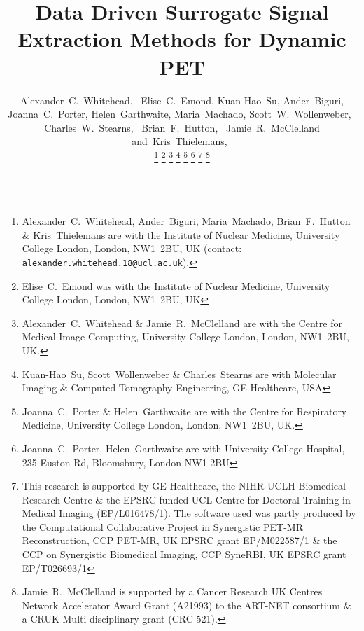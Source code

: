 \documentclass[10pt, twocolumn, twoside, letterpaper]{IEEEtran}
\begin{document}
\title{Data Driven Surrogate Signal Extraction Methods for Dynamic PET}

\pagestyle{plain}

\author{Alexander~C.~Whitehead,~
        Elise~C.~Emond,
        Kuan-Hao~Su,
        Ander~Biguri,
        Joanna~C.~Porter,
        Helen~Garthwaite,
        Maria~Machado,
        Scott~W.~Wollenweber,~
        Charles~W.~Stearns,~
        Brian~F.~Hutton,~
        Jamie~R.~McClelland
        and~Kris~Thielemans,~%
        
    \vspace{-1.0cm}

    \thanks{Alexander~C.~Whitehead, Ander~Biguri, Maria~Machado, Brian~F.~Hutton \& Kris~Thielemans are with the Institute of Nuclear Medicine, University College London, London, NW1~2BU, UK (contact: \texttt{alexander.whitehead.18@ucl.ac.uk}).}%
    \thanks{Elise~C.~Emond was with the Institute of Nuclear Medicine, University College London, London, NW1~2BU, UK}
    \thanks{Alexander~C.~Whitehead \& Jamie~R.~McClelland are with the Centre for Medical Image Computing, University College London, London, NW1~2BU, UK.}%
    \thanks{Kuan-Hao~Su, Scott~Wollenweber \& Charles~Stearns are with Molecular Imaging \& Computed Tomography Engineering, GE Healthcare, USA}%
    \thanks{Joanna~C.~Porter \& Helen~Garthwaite are with the Centre for Respiratory Medicine, University College London, London, NW1~2BU, UK.}%
    \thanks{Joanna~C.~Porter, Helen~Garthwaite are with University College Hospital, 235 Euston Rd, Bloomsbury, London NW1 2BU}%
    \thanks{This research is supported by GE Healthcare, the NIHR UCLH Biomedical Research Centre \& the EPSRC-funded UCL Centre for Doctoral Training in Medical Imaging (EP/L016478/1). The software used was partly produced by the Computational Collaborative Project in Synergistic PET-MR Reconstruction, CCP PET-MR, UK EPSRC grant EP/M022587/1 \& the CCP on Synergistic Biomedical Imaging, CCP SyneRBI, UK EPSRC grant EP/T026693/1}%
    \thanks{Jamie~R.~McClelland is supported by a Cancer Research UK Centres Network Accelerator Award Grant (A21993) to the ART-NET consortium \& a CRUK Multi-disciplinary grant (CRC 521).}%
}

\maketitle
\IEEEpeerreviewmaketitle
\end{document}
